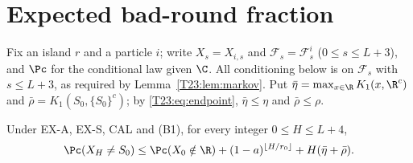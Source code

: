 \documentclass[11pt]{report}
\begin{document}
\section{Expected bad-round fraction}

Fix an island $r$ and a particle $i$; write $X_s=X_{i,s}$ and $\mathcal F_s=\mathcal F^i_s$ ($0\le s\le L+3$), and $\Pc$ for the conditional law given $\C$. All conditioning below is on $\mathcal F_s$ with $s\le L+3$, as required by Lemma~\ref{T23:lem:markov}.
Put $\bar\eta=\max_{x\in\R}K_1(x,\R^c)$ and $\bar\rho=K_1(S_0,\{S_0\}^c)$; by \eqref{T23:eq:endpoint}, $\bar\eta\le\eta$ and $\bar\rho\le\rho$.

\begin{T23lemma}\label{T23:lem:occ}
Under EX-A, EX-S, CAL and (B1), for every integer $0\le H\le L+4$,
\[
\Pc(X_H\neq S_0)\le\Pc(X_0\notin\R)+(1-a)^{\lfloor H/r_0\rfloor}+H(\bar\eta+\bar\rho).
\]
\end{T23lemma}
\end{document}
